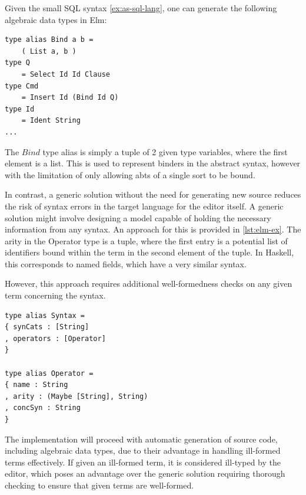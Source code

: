 \documentclass[sigplan,review]{acmart}
\newcommand{\abt}{\textsf{abt}\xspace}
\begin{document}
\begin{example}\label{ex:sql-data-types}
  Given the small SQL syntax \cref{ex:as-sql-lang}, one can generate the following algebraic data types in Elm:
  \begin{lstlisting}[style=examplestyle]
type alias Bind a b =
    ( List a, b )
type Q
    = Select Id Id Clause
type Cmd
    = Insert Id (Bind Id Q)
type Id
    = Ident String
...
\end{lstlisting}

  The $Bind$ type alias is simply a tuple of 2 given type variables,
  where the first element is a list. This is used to represent binders in the
  abstract syntax, however with the limitation of only allowing {\abt}s of a single
  sort to be bound.
\end{example}

In contrast, a generic solution without the need for generating new source reduces the risk of syntax errors in the target language for the editor itself. A generic solution might involve designing a model capable of holding the necessary information from any syntax. An approach for this is provided in \cref{lst:elm-ex}.
The arity in the Operator type is a tuple, where the first entry is a potential
list of identifiers bound within the term in the second element of the tuple.
In Haskell, this corresponds to named fields\cite{haskell-records-named-fields},
which have a very similar syntax.

However, this approach requires additional well-formedness checks on any given term concerning the syntax.

\begin{minipage}{\linewidth}
  \begin{lstlisting}[style=inline,caption={Elm Records for storing syntax information},label={lst:elm-ex}]
type alias Syntax =
{ synCats : [String]
, operators : [Operator]
}

type alias Operator =
{ name : String
, arity : (Maybe [String], String)
, concSyn : String
}
\end{lstlisting}
\end{minipage}

The implementation will proceed with automatic generation of source code,
including algebraic data types, due to their advantage in handling ill-formed
terms effectively. If given an ill-formed term, it is considered ill-typed by
the editor, which poses an advantage over the generic solution requiring
thorough checking to ensure that given terms are well-formed.
\end{document}
